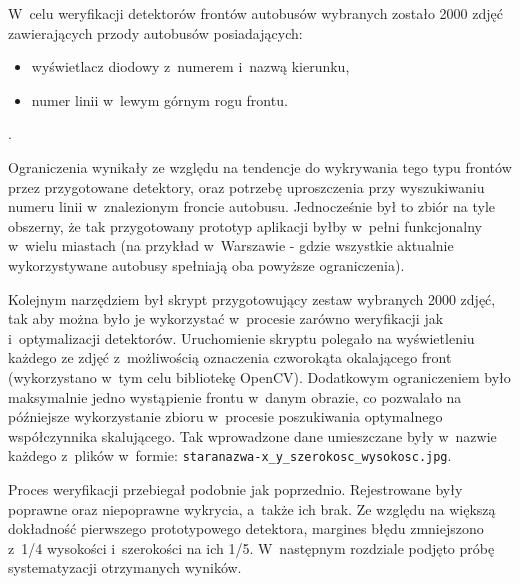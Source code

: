 W~celu weryfikacji detektorów frontów autobusów wybranych zostało 2000
zdjęć zawierających przody autobusów posiadających:

\begin{itemize}
    \item wyświetlacz diodowy z~numerem i~nazwą kierunku,
    \item numer linii w~lewym górnym rogu frontu.
\end{itemize}.

Ograniczenia wynikały ze względu na tendencje do wykrywania 
tego typu frontów przez przygotowane detektory, oraz
potrzebę uproszczenia przy wyszukiwaniu numeru linii w~znalezionym
froncie autobusu. Jednocześnie
był to zbiór na tyle obszerny, że tak przygotowany prototyp aplikacji byłby
w~pełni funkcjonalny w~wielu miastach (na przykład w~Warszawie - gdzie
wszystkie aktualnie wykorzystywane autobusy spełniają oba powyższe
ograniczenia).

Kolejnym narzędziem był skrypt przygotowujący zestaw wybranych 2000 zdjęć,
tak aby można było je wykorzystać w~procesie zarówno weryfikacji jak 
i~optymalizacji detektorów. Uruchomienie skryptu polegało na wyświetleniu
każdego ze zdjęć z~możliwością oznaczenia czworokąta okalającego front
(wykorzystano w~tym celu bibliotekę OpenCV). Dodatkowym ograniczeniem
było maksymalnie jedno wystąpienie frontu w~danym obrazie, co 
pozwalało na późniejsze wykorzystanie zbioru w~procesie
poszukiwania optymalnego współczynnika skalującego. Tak wprowadzone
dane umieszczane były w~nazwie każdego z~plików w~formie:
\verb|staranazwa-x_y_szerokosc_wysokosc.jpg|.

Proces weryfikacji przebiegał podobnie jak poprzednio. Rejestrowane były
poprawne oraz niepoprawne wykrycia, a~także ich brak. Ze względu na
większą dokładność pierwszego prototypowego detektora, margines
błędu zmniejszono z~1/4 wysokości i~szerokości na ich 1/5.
W~następnym rozdziale podjęto próbę systematyzacji otrzymanych wyników.

